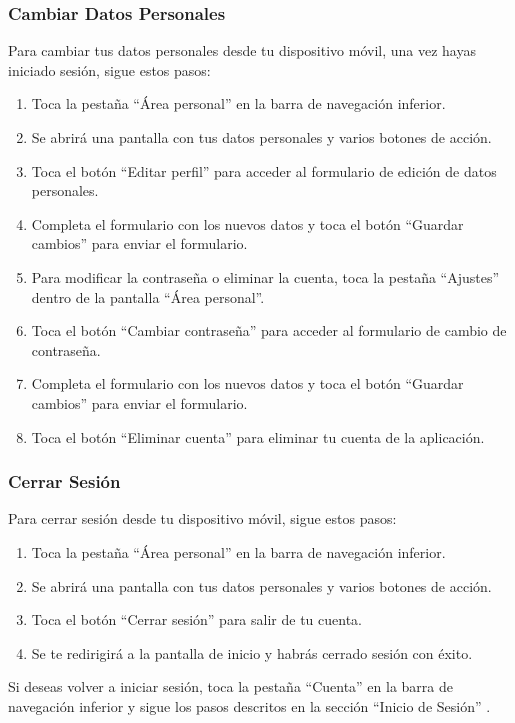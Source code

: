 \subsubsection{Cambiar Datos Personales}
Para cambiar tus datos personales desde tu dispositivo móvil, una vez hayas iniciado sesión, sigue estos pasos:
\begin{enumerate}
	\item Toca la pestaña “Área personal” en la barra de navegación inferior.
	\item Se abrirá una pantalla con tus datos personales y varios botones de acción.
	\item Toca el botón “Editar perfil” para acceder al formulario de edición de datos personales.
	\item Completa el formulario con los nuevos datos y toca el botón “Guardar cambios” para enviar el formulario.
	\item Para modificar la contraseña o eliminar la cuenta, toca la pestaña “Ajustes” dentro de la pantalla “Área personal”.
	\item Toca el botón “Cambiar contraseña” para acceder al formulario de cambio de contraseña.
	\item Completa el formulario con los nuevos datos y toca el botón “Guardar cambios” para enviar el formulario.
	\item Toca el botón “Eliminar cuenta” para eliminar tu cuenta de la aplicación.
\end{enumerate}

\subsubsection{Cerrar Sesión}
Para cerrar sesión desde tu dispositivo móvil, sigue estos pasos:
\begin{enumerate}
	\item Toca la pestaña “Área personal” en la barra de navegación inferior.
	\item Se abrirá una pantalla con tus datos personales y varios botones de acción.
	\item Toca el botón “Cerrar sesión” para salir de tu cuenta.
	\item Se te redirigirá a la pantalla de inicio y habrás cerrado sesión con éxito.
\end{enumerate}
Si deseas volver a iniciar sesión, toca la pestaña “Cuenta” en la barra de navegación inferior y sigue los pasos descritos en la sección “Inicio de Sesión” .

